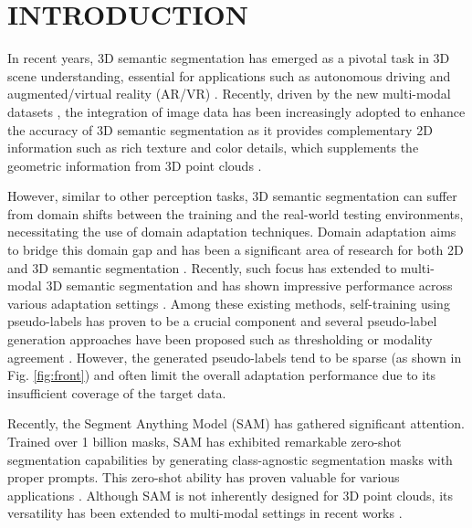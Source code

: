 \section{INTRODUCTION}
In recent years, 3D semantic segmentation has emerged as a pivotal task in 3D scene understanding, essential for applications such as autonomous driving  \cite{wu2018squeezeseg, xu2021rpvnet} and augmented/virtual reality (AR/VR) \cite{choy20194d, thomas2019kpconv, qi2017pointnet++}. Recently, driven by the new multi-modal datasets \cite{caesar2020nuscenes, behley2019semantickitti}, the integration of image data has been increasingly adopted to enhance the accuracy of 3D semantic segmentation as it provides complementary 2D information such as rich texture and color details, which supplements the geometric information from 3D point clouds \cite{su2018splatnet, meyer2019sensor}. 

However, similar to other perception tasks, 3D semantic segmentation can suffer from domain shifts between the training and the real-world testing environments, necessitating the use of domain adaptation techniques. Domain adaptation aims to bridge this domain gap and has been a significant area of research for both 2D and 3D semantic segmentation \cite{hoffman2018cycada, li2019bidirectional, vu2019advent, wu2019squeezesegv2, yi2021complete}. Recently, such focus has extended to multi-modal 3D semantic segmentation and has shown impressive performance across various adaptation settings \cite{jaritz2020xmuda, cao2024mopa, shin2022mm, simons2023summit}. Among these existing methods, self-training using pseudo-labels has proven to be a crucial component and several pseudo-label generation approaches have been proposed such as thresholding \cite{jaritz2020xmuda} or modality agreement \cite{shin2022mm, simons2023summit}. However, the generated pseudo-labels tend to be sparse (as shown in Fig. \ref{fig:front}) and often limit the overall adaptation performance due to its insufficient coverage of the target data. 

\figFront

Recently, the Segment Anything Model (SAM) \cite{kirillov2023segment, ravi2024sam} has gathered significant attention. Trained over 1 billion masks, SAM has exhibited remarkable zero-shot segmentation capabilities by generating class-agnostic segmentation masks with proper prompts. This zero-shot ability has proven valuable for various applications \cite{huang2023push, ma2024segment, huang2024segment, chen2023segment}. Although SAM is not inherently designed for 3D point clouds, its versatility has been extended to multi-modal settings in recent works \cite{cao2024mopa, peng2023sam, liu2024segment}. 

